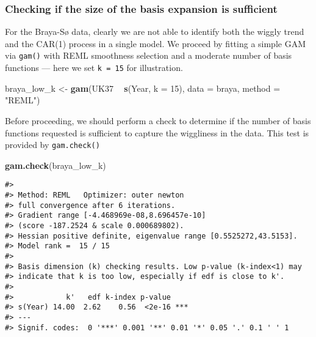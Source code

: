 \documentclass[12pt,]{article}
\newenvironment{Shaded}{\begin{snugshade}}{\end{snugshade}}
\newcommand{\DataTypeTok}[1]{\textcolor[rgb]{0.13,0.29,0.53}{#1}}
\newcommand{\DecValTok}[1]{\textcolor[rgb]{0.00,0.00,0.81}{#1}}
\newcommand{\KeywordTok}[1]{\textcolor[rgb]{0.13,0.29,0.53}{\textbf{#1}}}
\newcommand{\NormalTok}[1]{#1}
\newcommand{\OperatorTok}[1]{\textcolor[rgb]{0.81,0.36,0.00}{\textbf{#1}}}
\newcommand{\StringTok}[1]{\textcolor[rgb]{0.31,0.60,0.02}{#1}}
\begin{document}
\hypertarget{checking-if-the-size-of-the-basis-expansion-is-sufficient}{%
\subsubsection{Checking if the size of the basis expansion is
sufficient}\label{checking-if-the-size-of-the-basis-expansion-is-sufficient}}

For the Braya-Sø data, clearly we are not able to identify both the
wiggly trend and the CAR(1) process in a single model. We proceed by
fitting a simple GAM via \texttt{gam()} with REML smoothness selection
and a moderate number of basis functions --- here we set
\texttt{k\ =\ 15} for illustration.

\begin{Shaded}
\begin{Highlighting}[]
\NormalTok{braya_low_k <-}\StringTok{ }\KeywordTok{gam}\NormalTok{(UK37 }\OperatorTok{~}\StringTok{ }\KeywordTok{s}\NormalTok{(Year, }\DataTypeTok{k =} \DecValTok{15}\NormalTok{), }\DataTypeTok{data =}\NormalTok{ braya, }\DataTypeTok{method =} \StringTok{"REML"}\NormalTok{)}
\end{Highlighting}
\end{Shaded}

Before proceeding, we should perform a check to determine if the number
of basis functions requested is sufficient to capture the wiggliness in
the data. This test is provided by \texttt{gam.check()}

\begin{Shaded}
\begin{Highlighting}[]
\KeywordTok{gam.check}\NormalTok{(braya_low_k)}
\end{Highlighting}
\end{Shaded}

\begin{verbatim}
#> 
#> Method: REML   Optimizer: outer newton
#> full convergence after 6 iterations.
#> Gradient range [-4.468969e-08,8.696457e-10]
#> (score -187.2524 & scale 0.000689802).
#> Hessian positive definite, eigenvalue range [0.5525272,43.5153].
#> Model rank =  15 / 15 
#> 
#> Basis dimension (k) checking results. Low p-value (k-index<1) may
#> indicate that k is too low, especially if edf is close to k'.
#> 
#>            k'   edf k-index p-value    
#> s(Year) 14.00  2.62    0.56  <2e-16 ***
#> ---
#> Signif. codes:  0 '***' 0.001 '**' 0.01 '*' 0.05 '.' 0.1 ' ' 1
\end{verbatim}
\end{document}
